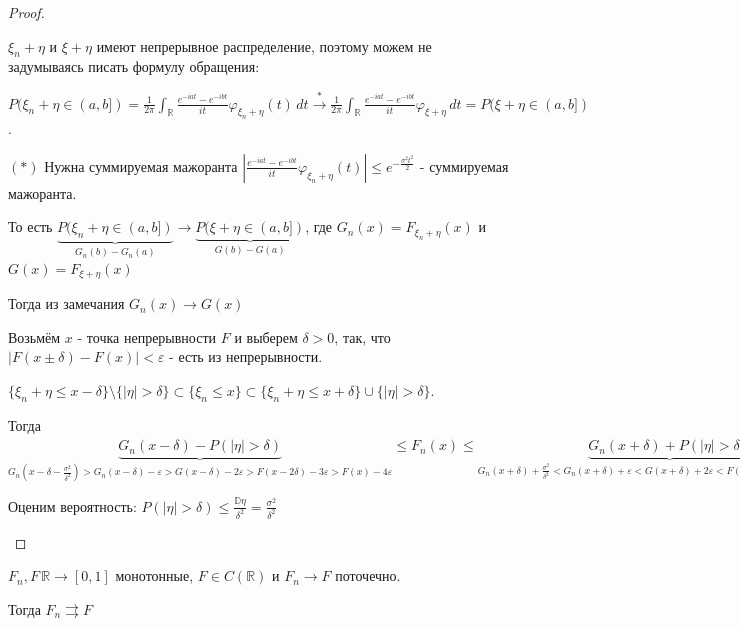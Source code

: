 \begin{proof}
\begin{enumerate}
{            $\xi_n + \eta$ и $\xi + \eta$ имеют непрерывное распределение, поэтому можем не задумываясь писать формулу обращения:

            $P(\xi_n + \eta \in (a, b]) = \frac{1}{2\pi} \int_{\mathbb{R}} \frac{e^{-iat} - e^{-ibt}}{it} \varphi_{\xi_n + \eta} (t) \, dt \overset{*}{\rightarrow} \frac{1}{2\pi} \int_{\mathbb{R}} \frac{e^{-iat} - e^{-ibt}}{it} \varphi_{\xi + \eta} \, dt = P(\xi + \eta \in (a, b])$.

            $(*)$ Нужна суммируемая мажоранта $\left | \frac{e^{-iat} - e^{-ibt}}{it} \varphi_{\xi_n + \eta} (t) \right | \leqslant e^{-\frac{\sigma^2t^2}{2}}$ - суммируемая мажоранта.

            То есть $\underbrace{P(\xi_n + \eta \in (a, b])}_{G_n (b) - G_n(a)} \rightarrow \underbrace{P(\xi + \eta \in (a, b])}_{G(b) - G(a)}$, где $G_n (x) = F_{\xi_n + \eta}(x)$ и $G(x) = F_{\xi + \eta} (x)$

            Тогда из замечания $G_n(x) \rightarrow G(x)$

            Возьмём $x$ - точка непрерывности $F$ и выберем $\delta > 0$, так, что $|F(x \pm \delta) - F(x)| < \varepsilon$ - есть из непрерывности.

            $ \{ \xi_n + \eta \leqslant x - \delta \} \setminus \{ |\eta| > \delta \} \subset  \{ \xi_n \leqslant x \} \subset \{ \xi_n + \eta \leqslant x + \delta \} \cup \{ |\eta| > \delta \}$.

            Тогда $\underbrace{G_{n} (x - \delta) - P(|\eta| > \delta)}_{G_n (x - \delta - \frac{\sigma^2}{\delta^2}) > G_n (x - \delta) - \varepsilon > G(x - \delta) - 2\varepsilon > F(x - 2\delta) - 3\varepsilon > F(x) - 4\varepsilon} \leqslant F_n (x) \leqslant
            \underbrace{G_{n} (x + \delta) + P(|\eta| > \delta)}_{G_n (x + \delta) + \frac{\sigma^2}{\delta^2} < G_n (x + \delta) + \varepsilon < G(x + \delta) + 2\varepsilon < F(x + 2\delta) + 3\varepsilon < F(x) + 4\varepsilon}$

            Оценим вероятность: $P(|\eta| > \delta) \leqslant \frac{\mathbb{D} \eta}{\delta^2} = \frac{\sigma^2}{\delta^2}$


        }
    \end{enumerate}
\end{proof}

\begin{theorem}
    $F_n, F \, \mathbb{R} \to [0, 1]$ монотонные, $F \in C(\mathbb{R})$ и
    $F_n \to F$ поточечно.

    Тогда $F_n \rightrightarrows F$
\end{theorem}

